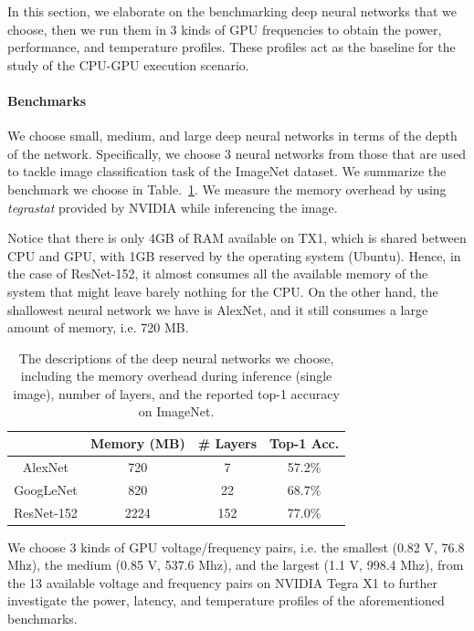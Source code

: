 
In this section, we elaborate on the benchmarking deep neural networks that we choose, then we run them in 3 kinds of GPU frequencies to obtain the power, performance, and temperature profiles. These profiles act as the baseline for the study of the CPU-GPU execution scenario.

\paragraph{Benchmarks}

We choose small, medium, and large deep neural networks in terms of the depth of the network. Specifically, we choose 3 neural networks from those that are used to tackle image classification task of the ImageNet dataset. We summarize the benchmark we choose in Table.~\ref{table:1}. We measure the memory overhead by using \textit{tegrastat} provided by NVIDIA while inferencing the image.

Notice that there is only 4GB of RAM available on TX1, which is shared between CPU and GPU, with 1GB reserved by the operating system (Ubuntu). Hence, in the case of ResNet-152, it almost consumes all the available memory of the system that might leave barely nothing for the CPU. On the other hand, the shallowest neural network we have is AlexNet, and it still consumes a large amount of memory, i.e. 720 MB.


\begin{table}[h]
    \begin{center}
        \begin{tabular}{ | c | c | c | c | }
        \hline
        & Memory (MB) & \# Layers & Top-1 Acc. \\ \hline
        AlexNet{\cite{krizhevsky2012imagenet}} & 720 & 7 & 57.2\% \\ \hline
        GoogLeNet{\cite{szegedy2015going}} & 820 & 22 & 68.7\%  \\ \hline
        ResNet-152{\cite{he2016deep}} & 2224 & 152 & 77.0\% \\
        \hline
        \end{tabular}
    \end{center}
    \caption{The descriptions of the deep neural networks we choose, including the memory overhead during inference (single image), number of layers, and the reported top-1 accuracy on ImageNet.}\label{table:1}
\end{table}

We choose 3 kinds of GPU voltage/frequency pairs, i.e. the smallest (0.82 V, 76.8 Mhz), the medium (0.85 V, 537.6 Mhz), and the largest (1.1 V, 998.4 Mhz), from the 13 available voltage and frequency pairs on NVIDIA Tegra X1 to further investigate the power, latency, and temperature profiles of the aforementioned benchmarks.

